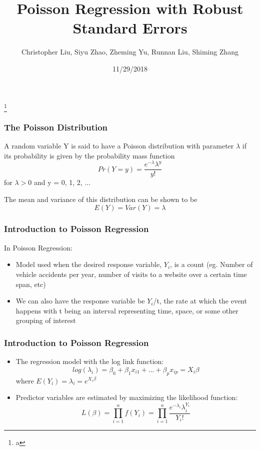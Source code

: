 \documentclass{beamer}
\title{Poisson Regression with Robust Standard Errors}
\author{Christopher Liu, Siyu Zhao, Zheming Yu, Runnan Liu, Shiming Zhang}
\institute{San Diego State University, Stats 610}
\date{11/29/2018}
\begin{document}
	

\begin{frame}[plain]

	\titlepage
	
	\footnote{a}

\end{frame}



\begin{frame}[fragile]\frametitle{The Poisson Distribution}

	A random variable Y is said to have a Poisson distribution with parameter $\lambda$ if its probability is given by the probability mass function
	$$ Pr(Y = y) = \frac{e^{-\lambda}\lambda^{y}}{y!} $$
	for $\lambda > 0$ and y = 0, 1, 2, ... 
 
	The mean and variance of this distribution can be shown to be
	$$ E(Y) = Var(Y) = \lambda $$ 

\end{frame}



\begin{frame}[fragile]\frametitle{Introduction to Poisson Regression}
	In Poisson Regression:
	
	\begin{itemize}
	
		\item Model used when the desired response variable, $Y_{i}$, is a count (eg. Number of vehicle accidents per year, number of visits to a website over a certain time span, etc)
		\item We can also have the response variable be $Y_{i}$/t, the rate at which the event happens with t being an interval representing time, space, or some other grouping of interest

	\end{itemize}

\end{frame}



\begin{frame}[fragile]\frametitle{Introduction to Poisson Regression}

	\begin{itemize}
		
		\item The regression model with the log link function:
 		$$ log(\lambda_i) = \beta_0 + \beta_1 x_{i1} + ... + \beta_p x_{ip} = X_i \beta $$  		
 		where $ E(Y_i) = \lambda_i = e^{X_i \beta}$

		\item Predictor variables are estimated by maximizing the likelihood function:
		$$ L(\beta) = \prod_{i=1}^{n} f(Y_i) = \prod_{i=1}^{n} \frac{ e^{-\lambda_i} \lambda_i^{Y_i} }{Y_i!} $$
		
	\end{itemize}
	
\end{frame}
\end{document}
